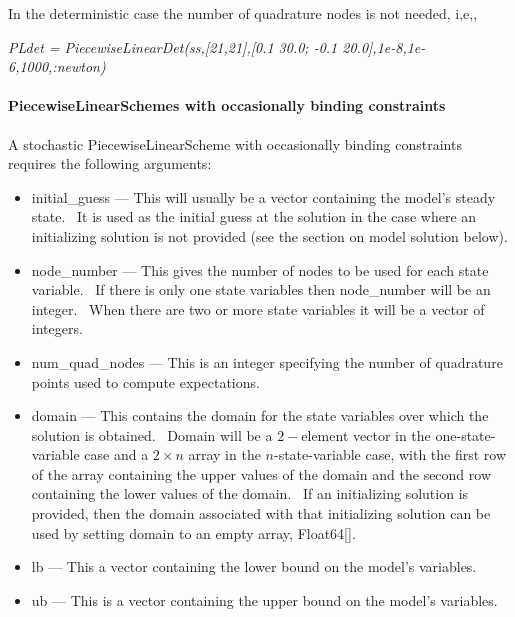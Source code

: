 \documentclass[notitlepage,11pt]{article}
\begin{document}
\bigskip

In the deterministic case the number of quadrature nodes is not needed, i,e,,

\bigskip

\textit{PLdet = PiecewiseLinearDet(ss,[21,21],[0.1 30.0; -0.1
20.0],1e-8,1e-6,1000,:newton)}

\paragraph{PiecewiseLinearSchemes with occasionally binding constraints}

A stochastic PiecewiseLinearScheme with occasionally binding constraints
requires the following arguments:

\begin{itemize}
\item initial\_guess --- This will usually be a vector containing the
model's steady state. \ It is used as the initial guess at the solution in
the case where an initializing solution is not provided (see the section on
model solution below).

\item node\_number --- This gives the number of nodes to be used for each
state variable. \ If there is only one state variables then node\_number
will be an integer. \ When there are two or more state variables it will be
a vector of integers.

\item num\_quad\_nodes --- This is an integer specifying the number of
quadrature points used to compute expectations.

\item domain --- This contains the domain for the state variables over which
the solution is obtained. \ Domain will be a $2-$element vector in the
one-state-variable case and a $2\times n$ array in the $n$-state-variable
case, with the first row of the array containing the upper values of the
domain and the second row containing the lower values of the domain. \ If an
initializing solution is provided, then the domain associated with that
initializing solution can be used by setting domain to an empty array,
Float64[].

\item lb --- This a vector containing the lower bound on the model's
variables.

\item ub --- This is a vector containing the upper bound on the model's
variables.


\end{itemize}
\end{document}
